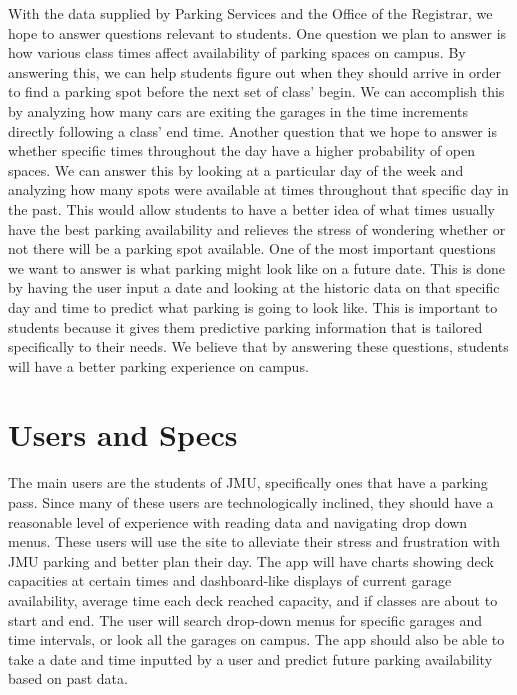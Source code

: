 \documentclass[11pt]{article}
\begin{document}
With the data supplied by Parking Services and the Office of the Registrar, we hope to answer questions relevant to students. One question we plan to answer is how various class times affect availability of parking spaces on campus. By answering this, we can help students figure out when they should arrive in order to find a parking spot before the next set of class' begin. We can accomplish this by analyzing how many cars are exiting the garages in the time increments directly following a class' end time. Another question that we hope to answer is whether specific times throughout the day have a higher probability of open spaces. We can answer this by looking at a particular day of the week and analyzing how many spots were available at times throughout that specific day in the past. This would allow students to have a better idea of what times usually have the best parking availability and relieves the stress of wondering whether or not there will be a parking spot available. One of the most important questions we want to answer is what parking might look like on a future date. This is done by having the user input a date and looking at the historic data on that specific day and time to predict what parking is going to look like. This is important to students because it gives them predictive parking information that is tailored specifically to their needs. We believe that by answering these questions, students will have a better parking experience on campus.

\section*{Users and Specs}



\qquad The main users are the students of JMU, specifically ones that have a parking pass. Since many of these users are technologically inclined, they should have a reasonable level of experience with reading data and navigating drop down menus. These users will use the site to alleviate their stress and frustration with JMU parking and better plan their day. The app will have charts showing deck capacities at certain times and dashboard-like displays of current garage availability, average time each deck reached capacity, and if classes are about to start and end. The user will search drop-down menus for specific garages and time intervals, or look all the garages on campus. The app should also be able to take a date and time inputted by a user and predict future parking availability based on past data. 
\end{document}
